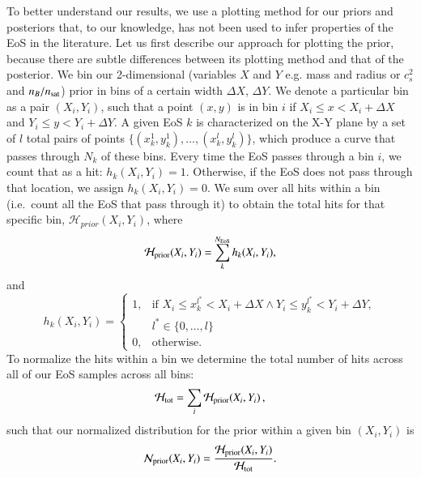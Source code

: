 \documentclass[aps,prd,nofootinbib,tightenlines,notitlepage,floatfix,superscriptaddress,showkeys,twocolumn]{revtex4-1}
\begin{document}
To better understand our results, we use a plotting method for our priors and posteriors that, to our knowledge, has not been used to infer properties of the EoS in the literature. Let us first describe our approach for plotting the prior, because there are subtle differences between its plotting method and that of the posterior. We bin our 2-dimensional (variables $X$ and $Y$ e.g. mass and radius or $c_s^2$ and $n_B/n_{\rm sat}$) prior in bins of a certain width $\Delta X$, $\Delta Y$. We denote a particular bin as a pair $(X_i,Y_i)$, such that a point $(x,y)$ is in bin $i$ if $X_i \leq x < X_i + \Delta X$ and $Y_i \leq y < Y_i + \Delta Y$. A given EoS $k$ is characterized on the X-Y plane by a set of $l$ total pairs of points $\{(x_k^1,y_k^1),\ldots, (x_k^l,y_k^l)\}$, which produce a curve that passes through $N_k$ of these bins. Every time the EoS passes through a bin $i$, we count that as a hit: $h_k(X_i,Y_i)=1$. Otherwise, if the EoS does not pass through that location, we assign $h_k(X_i,Y_i)=0$. We sum over all hits within a bin (i.e.~count all the EoS that pass through it) to obtain the total hits for that specific bin, $\mathcal{H}_{prior}(X_i,Y_i)$, where
\begin{equation}\label{eqn:Hprior}
    \mathcal{H}_{\rm prior}(X_i,Y_i)=\sum_k^{N_{\rm EoS}} h_k(X_i,Y_i), 
\end{equation}
and
\begin{equation}
    h_k(X_i,Y_i)= \begin{cases}
    1,& \text{if } X_i \leq x^{l^*}_k < X_i + \Delta X \wedge Y_i \leq y^{l^*}_k < Y_i + \Delta Y,\\ 
    & l^*\in\{0,\ldots,l\}\\
    0,& \text{otherwise.}
\end{cases}
\end{equation}
To normalize the hits within a bin we determine the total number of hits across all of our EoS samples across all bins:
\begin{equation}\label{eqn:Htot}
    \mathcal{H}_{\rm tot}=\sum_{i} \mathcal{H}_{\rm prior}(X_i,Y_i)\,, 
\end{equation}
such that our normalized distribution for the prior within a given bin $(X_i, Y_i)$ is
\begin{equation}\label{eq:normalizedprior}
    \mathcal{N}_{\rm prior}(X_i,Y_i)=\frac{\mathcal{H}_{\rm prior}(X_i,Y_i) }{\mathcal{H}_{\rm tot}}.
\end{equation}
\end{document}
